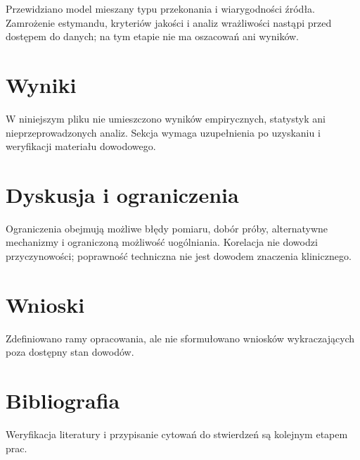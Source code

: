 \documentclass[11pt,a4paper]{article}
\begin{document}
Przewidziano model mieszany typu przekonania i wiarygodności źródła. Zamrożenie estymandu, kryteriów jakości i analiz wrażliwości nastąpi przed dostępem do danych; na tym etapie nie ma oszacowań ani wyników.

\section{Wyniki}

W niniejszym pliku nie umieszczono wyników empirycznych, statystyk ani nieprzeprowadzonych analiz. Sekcja wymaga uzupełnienia po uzyskaniu i weryfikacji materiału dowodowego.

\section{Dyskusja i ograniczenia}

Ograniczenia obejmują możliwe błędy pomiaru, dobór próby, alternatywne mechanizmy i ograniczoną możliwość uogólniania. Korelacja nie dowodzi przyczynowości; poprawność techniczna nie jest dowodem znaczenia klinicznego.

\section{Wnioski}

Zdefiniowano ramy opracowania, ale nie sformułowano wniosków wykraczających poza dostępny stan dowodów.

\section*{Bibliografia}

Weryfikacja literatury i przypisanie cytowań do stwierdzeń są kolejnym etapem prac.
\end{document}
